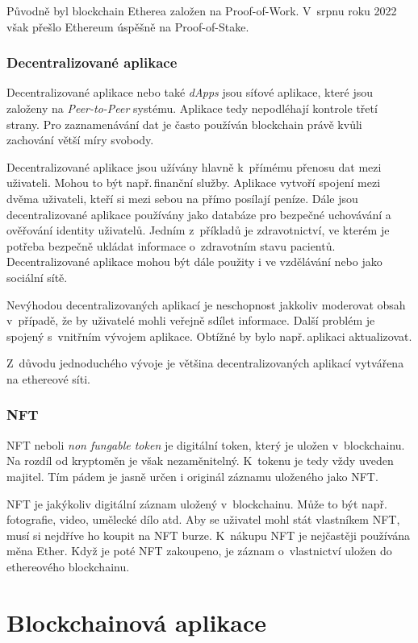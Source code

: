 \documentclass[12pt]{report}			%
\begin{document}
{{Původně byl blockchain Etherea založen na Proof-of-Work. V~srpnu roku 2022 však přešlo Ethereum úspěšně na Proof-of-Stake. \cite{Antonopoulos2019}	
}
		\section{Decentralizované aplikace}{
Decentralizované aplikace nebo také \textit{dApps} jsou síťové aplikace, které jsou založeny na \textit{Peer-to-Peer} systému. Aplikace tedy nepodléhají kontrole třetí strany. Pro zaznamenávání dat je často používán blockchain právě kvůli zachování větší míry svobody. \cite{Frankenfield2023}

Decentralizované aplikace jsou užívány hlavně k~přímému přenosu dat mezi uživateli. Mohou to být např.\,finanční služby. Aplikace vytvoří spojení mezi dvěma uživateli, kteří si mezi sebou na přímo posílají peníze. Dále jsou decentralizované aplikace používány jako databáze pro bezpečné uchovávání a ověřování identity uživatelů. Jedním z~příkladů je zdravotnictví, ve kterém je potřeba bezpečně ukládat informace o~zdravotním stavu pacientů. Decentralizované aplikace mohou být dále použity i ve vzdělávání nebo jako sociální sítě. \cite{Frankenfield2023}

Nevýhodou decentralizovaných aplikací je neschopnost jakkoliv moderovat obsah v~případě, že by uživatelé mohli veřejně sdílet informace. Další problém je spojený s~vnitřním vývojem aplikace. Obtížné by bylo např.\,aplikaci aktualizovat.

Z~důvodu jednoduchého vývoje je většina decentralizovaných aplikací vytvářena na ethereové síti.
\cite{Frankenfield2023}
}
 		\section{NFT}{
NFT neboli \textit{non fungable token} je digitální token, který je uložen v~blockchainu. Na rozdíl od kryptoměn je však nezaměnitelný. K~tokenu je tedy vždy uveden majitel. Tím pádem je jasně určen i originál záznamu uloženého jako NFT. 

NFT je jakýkoliv digitální záznam uložený v~blockchainu. Může to být např.\,fotografie, video, umělecké dílo atd. Aby se uživatel mohl stát vlastníkem NFT, musí si nejdříve ho koupit na NFT burze. K~nákupu NFT je nejčastěji používána měna Ether. Když je poté NFT zakoupeno, je záznam o~vlastnictví uložen do ethereového blockchainu.
\cite{Sharma2023}
 		}
	\part{Blockchainová aplikace}
}
\end{document}
